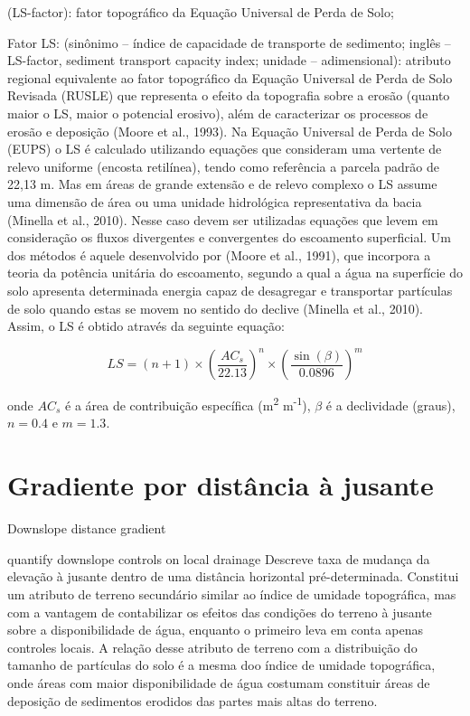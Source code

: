 \documentclass[]{book}
\begin{document}
(LS-factor): fator topográﬁco da Equação Universal de Perda de Solo;

Fator LS: (sinônimo -- índice de capacidade de transporte de sedimento;
inglês -- LS-factor, sediment transport capacity index; unidade --
adimensional): atributo regional equivalente ao fator topográfico da
Equação Universal de Perda de Solo Revisada (RUSLE) que representa o
efeito da topografia sobre a erosão (quanto maior o LS, maior o
potencial erosivo), além de caracterizar os processos de erosão e
deposição (Moore et al., 1993). Na Equação Universal de Perda de Solo
(EUPS) o LS é calculado utilizando equações que consideram uma vertente
de relevo uniforme (encosta retilínea), tendo como referência a parcela
padrão de 22,13 m. Mas em áreas de grande extensão e de relevo complexo
o LS assume uma dimensão de área ou uma unidade hidrológica
representativa da bacia (Minella et al., 2010). Nesse caso devem ser
utilizadas equações que levem em consideração os fluxos divergentes e
convergentes do escoamento superficial. Um dos métodos é aquele
desenvolvido por (Moore et al., 1991), que incorpora a teoria da
potência unitária do escoamento, segundo a qual a água na superfície do
solo apresenta determinada energia capaz de desagregar e transportar
partículas de solo quando estas se movem no sentido do declive (Minella
et al., 2010). Assim, o LS é obtido através da seguinte equação:

\[LS = (n + 1) \times \left(\frac{AC_s}{22.13}\right)^n \times \left(\frac{\sin(\beta)}{0.0896}\right)^m\]

onde \(AC_s\) é a área de contribuição específica (m\textsuperscript{2}
m\textsuperscript{-1}), \(\beta\) é a declividade (graus), \(n = 0.4\) e
\(m = 1.3\).

\section{Gradiente por distância à
jusante}\label{gradiente-por-distancia-a-jusante}

Downslope distance gradient

quantify downslope controls on local drainage Descreve taxa de mudança
da elevação à jusante dentro de uma distância horizontal
pré-determinada. Constitui um atributo de terreno secundário similar ao
índice de umidade topográfica, mas com a vantagem de contabilizar os
efeitos das condições do terreno à jusante sobre a disponibilidade de
água, enquanto o primeiro leva em conta apenas controles locais. A
relação desse atributo de terreno com a distribuição do tamanho de
partículas do solo é a mesma doo índice de umidade topográfica, onde
áreas com maior disponibilidade de água costumam constituir áreas de
deposição de sedimentos erodidos das partes mais altas do terreno.
\end{document}
